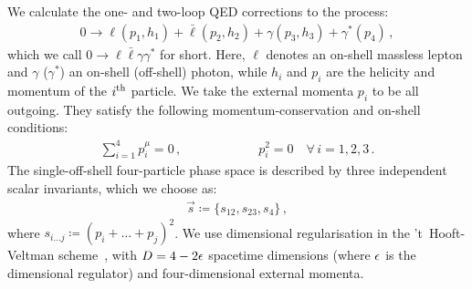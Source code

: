 \documentclass[main.tex]{subfiles}
\begin{document}
We calculate the one- and two-loop QED corrections to the process:
\begin{align}
    \label{eqQED:scatter}
    0 \to \ell(p_1,h_1) + \bar{\ell}(p_2,h_2) + \gamma(p_3,h_3) + \gamma^{*}(p_4) \,,
\end{align}
which we call $0\to \ell \bar\ell \gamma \gamma^*$ for short. 
Here, $\ell$ denotes an on-shell massless lepton and $\gamma$ ($\gamma^*$) an on-shell (off-shell) photon, while $h_i$ and $p_i$ are the helicity and momentum of the $i\textsuperscript{th}$ particle.
We take the external momenta $p_i$ to be all outgoing. They satisfy the following momentum-conservation and on-shell conditions:
\begin{align}
    \sum_{i=1}^{4} p_i^\mu = 0 \,, \qquad \qquad \qquad p_i^2 = 0 \quad \forall \, i=1,2,3\,.
\end{align}
The single-off-shell four-particle phase space is described by three independent scalar invariants, which we choose as:
\begin{align}
    \vec{s} \coloneqq \{s_{12}, s_{23}, s_4\} \,,
\end{align}
where $s_{i\ldots j} \coloneqq (p_i+\ldots+p_j)^2$.
We use dimensional regularisation in the 't~Hooft-Veltman scheme~\cite{Gnendiger:2017pys}, with $D=4-2\epsilon$ spacetime dimensions (where $\epsilon$ is the dimensional regulator) and four-dimensional external momenta.
\end{document}
